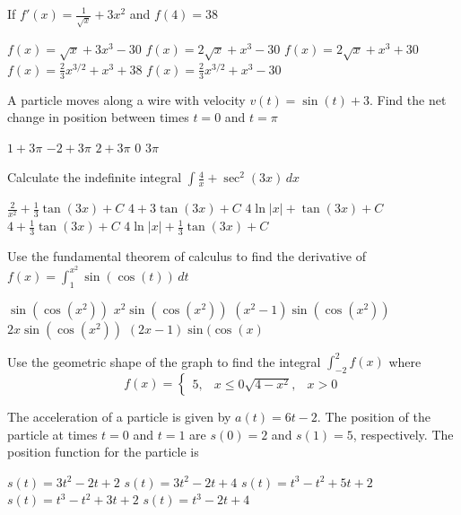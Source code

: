\documentclass[11pt]{article}
\begin{document}
\begin{questions}
\begin{multiplechoice}{5}
\question If $f'(x) = \frac{1}{\sqrt{x}} + 3x^2$ and $f(4) = 38$
\begin{answers}{2}
\ans $f(x) = \sqrt{x} + 3x^3 -30$
\ans $f(x) = 2\sqrt{x} + x^3 - 30$
\ans $f(x) = 2\sqrt{x} + x^3 + 30$
\ans $f(x) = \frac{2}{3} x^{3/2} + x^3 + 38$
\ans $f(x) = \frac{2}{3} x^{3/2} + x^3 - 30$ 
\end{answers}


\question A particle moves along a wire with velocity $v(t) = \sin(t) + 3$.  Find the
net change in position between times $t = 0$ and $t = \pi$
\begin{answers}{2}
\ans $1  + 3\pi$
\ans $-2 + 3\pi$
\ans $2 + 3\pi$
\ans $0$
\ans $3\pi$
\end{answers}

\question Calculate the indefinite integral 
$\displaystyle \int \frac{4}{x} + \sec^2(3x) \, dx$
\begin{answers}{2}
\ans $\frac{2}{x^2} + \frac{1}{3}\tan(3x) + C$
\ans $4 + 3 \tan(3x) + C$
\ans $4 \ln|x|  + \tan(3x) + C$
\ans $4  + \frac{1}{3}\tan(3x) + C$
\ans $4 \ln |x| + \frac{1}{3}\tan(3x) + C$
\end{answers}


\newpage

\question Use the fundamental theorem of calculus to find the derivative of 
$\displaystyle f(x) = \int_1^{x^2} \sin(\cos(t)) \, dt$
\begin{answers}{2}
\ans $\sin(\cos(x^2))$
\ans $x^2 \sin(\cos(x^2))$
\ans $(x^2 - 1) \sin(\cos(x^2))$
\ans $2x \sin(\cos(x^2))$
\ans $(2x - 1) \sin(\cos(x)$
\end{answers}

\question Use the geometric shape of the graph to find the integral 
$\displaystyle \int_{-2}^2 f(x)$ where 
$$ f(x) = 
\begin{cases}
5, & x \le 0
\sqrt{4 - x^2}, & x > 0
\end{cases}
$$

\question The acceleration of a particle is given by $a(t) = 6t - 2$.  The position
of the particle at times $t = 0$ and $t = 1$ are $s(0) = 2$ and $s(1) = 5$, respectively.  
The position function for the particle is
\begin{answers}{2}
\ans $s(t) = 3t^2 - 2t + 2$
\ans $s(t) = 3t^2 - 2t + 4$
\ans $s(t) = t^3 - t^2 + 5t + 2$
\ans $s(t) = t^3 - t^2 + 3t + 2$
\ans $s(t) = t^3 - 2t + 4$
\end{answers}


\end{multiplechoice}
\end{questions}
\end{document}
